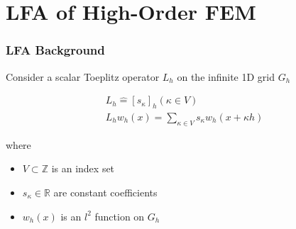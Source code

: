 \documentclass{beamer}
\begin{document}
\section{LFA of High-Order FEM}

\begin{frame}
\begin{center}
\frametitle{LFA Background}

Consider a scalar Toeplitz operator $L_h$ on the infinite 1D grid $G_h$

\begin{equation}
\begin{gathered}
L_h \mathrel{\hat{=}} \left[ s_\kappa \right]_h \left( \kappa \in V \right)\\
L_h w_h \left( x \right) = \sum_{\kappa \in V} s_\kappa w_h \left( x + \kappa h \right)
\end{gathered}
\end{equation}

\begin{flushleft}
where
\end{flushleft}

\begin{itemize}

\item $V \subset \mathbb{Z}$ is an index set

\item $s_\kappa \in \mathbb{R}$ are constant coefficients

\item $w_h \left( x \right)$ is an $l^2$ function on $G_h$

\end{itemize}

\end{center}
\end{frame}

\end{document}
